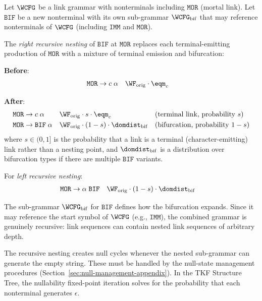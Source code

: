 \begin{definition}
\label{def:rec-nest-appendix}
Let $\WCFG$ be a link grammar with nonterminals including
$\texttt{MOR}$ (mortal link).  Let $\texttt{BIF}$ be a new
nonterminal with its own sub-grammar $\WCFG_{\mathrm{bif}}$
that may reference nonterminals of $\WCFG$ (including
$\texttt{IMM}$ and $\texttt{MOR}$).

The \emph{right recursive nesting} of $\texttt{BIF}$ at $\texttt{MOR}$
replaces each terminal-emitting production of $\texttt{MOR}$ with a
mixture of terminal emission and bifurcation:

\noindent\textbf{Before}:
\begin{align*}
\texttt{MOR} &\to c\;\alpha && \WF_{\mathrm{orig}} \cdot \eqm_c
\end{align*}

\noindent\textbf{After}:
\begin{align*}
\texttt{MOR} &\to c\;\alpha && \WF_{\mathrm{orig}} \cdot s \cdot \eqm_c
  && \text{(terminal link, probability } s\text{)} \\
\texttt{MOR} &\to \texttt{BIF}\;\alpha && \WF_{\mathrm{orig}} \cdot (1-s) \cdot \domdist_{\mathrm{bif}}
  && \text{(bifurcation, probability } 1-s\text{)}
\end{align*}
where $s \in (0,1]$ is the probability that a link is a terminal
(character-emitting) link rather than a nesting point, and
$\domdist_{\mathrm{bif}}$ is a distribution over bifurcation types
if there are multiple $\texttt{BIF}$ variants.

For \emph{left recursive nesting}:
\begin{align*}
\texttt{MOR} &\to \alpha\;\texttt{BIF} && \WF_{\mathrm{orig}} \cdot (1-s) \cdot \domdist_{\mathrm{bif}}
\end{align*}

The sub-grammar $\WCFG_{\mathrm{bif}}$ for $\texttt{BIF}$
defines how the bifurcation expands.  Since it may reference
the start symbol of $\WCFG$ (e.g., $\texttt{IMM}$), the
combined grammar is genuinely recursive: link sequences can
contain nested link sequences of arbitrary depth.
\end{definition}

\begin{remark}
The recursive nesting creates null cycles whenever the nested
sub-grammar can generate the empty string.  These must be
handled by the null-state management procedures
(Section~\ref{sec:null-management-appendix}).
In the TKF Structure Tree, the nullability fixed-point iteration
solves for the probability that each nonterminal generates $\epsilon$.
\end{remark}

